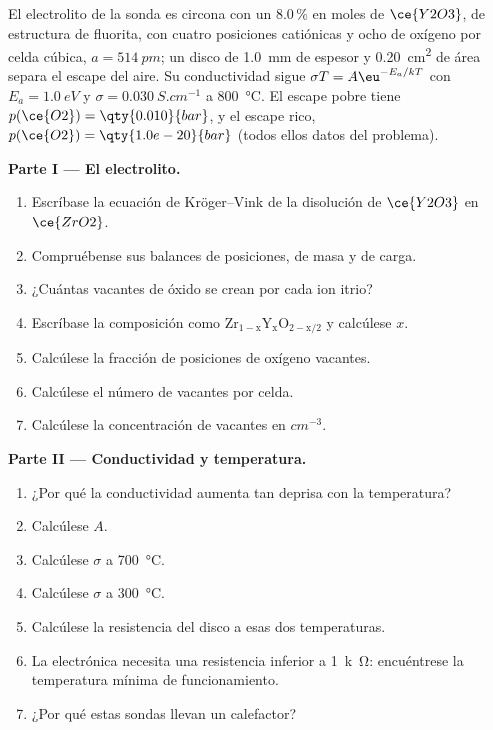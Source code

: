 \begin{problem}
\label{pb:b3:solid-state:1}
El electrolito de la sonda es circona con un 8.0\,\% en moles de $\ce{Y2O3}$, de estructura de fluorita,
con cuatro posiciones catiónicas y ocho de oxígeno por celda cúbica, $a = \qty{514}{pm}$; un disco
de \qty{1.0}{mm} de espesor y \qty{0.20}{cm^2} de área separa el escape del aire. Su
conductividad sigue $\sigma T = A\eu^{-E_a/kT}$ con $E_a = \qty{1.0}{eV}$ y $\sigma = \qty{0.030}{S.cm^{-1}}$ a \qty{800}{\celsius}. El escape
pobre tiene $p(\ce{O2}) = \qty{0.010}{bar}$, y el escape rico, $p(\ce{O2}) = \qty{1.0e-20}{bar}$ (todos ellos datos del problema).

\medskip\noindent\textbf{Parte I --- El electrolito.}
\begin{enumerate}
  \item Escríbase la ecuación de Kröger--Vink de la disolución de $\ce{Y2O3}$ en $\ce{ZrO2}$.
  \item Compruébense sus balances de posiciones, de masa y de carga.
  \item ¿Cuántas vacantes de óxido se crean por cada ion itrio?
  \item Escríbase la composición como $\mathrm{Zr_{1-x}Y_xO_{2-x/2}}$ y calcúlese $x$.
  \item Calcúlese la fracción de posiciones de oxígeno vacantes.
  \item Calcúlese el número de vacantes por celda.
  \item Calcúlese la concentración de vacantes en $\unit{cm^{-3}}$.
\end{enumerate}

\medskip\noindent\textbf{Parte II --- Conductividad y temperatura.}
\begin{enumerate}[resume]
  \item ¿Por qué la conductividad aumenta tan deprisa con la temperatura?
  \item Calcúlese $A$.
  \item Calcúlese $\sigma$ a \qty{700}{\celsius}.
  \item Calcúlese $\sigma$ a \qty{300}{\celsius}.
  \item Calcúlese la resistencia del disco a esas dos temperaturas.
  \item La electrónica necesita una resistencia inferior a \qty{1}{k\ohm}: encuéntrese la temperatura
        mínima de funcionamiento.
  \item ¿Por qué estas sondas llevan un calefactor?
\end{enumerate}


\end{problem}
